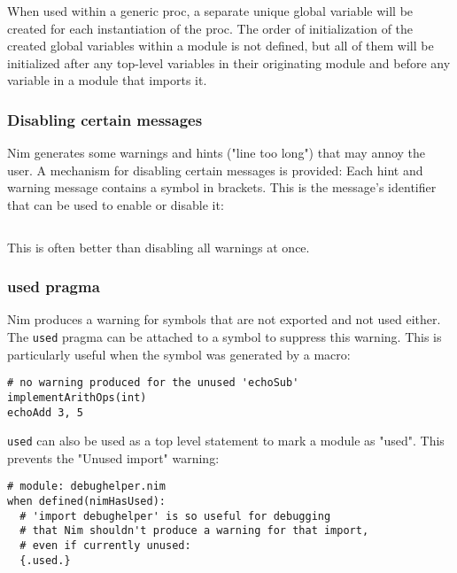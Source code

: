 \begin{verbatim}
\end{verbatim}

When used within a generic proc, a separate unique global variable will
be created for each instantiation of the proc. The order of
initialization of the created global variables within a module is not
defined, but all of them will be initialized after any top-level
variables in their originating module and before any variable in a
module that imports it.

\hypertarget{disabling-certain-messages}{%
\subsubsection{Disabling certain
messages}\label{disabling-certain-messages}}

Nim generates some warnings and hints ("line too long") that may annoy
the user. A mechanism for disabling certain messages is provided: Each
hint and warning message contains a symbol in brackets. This is the
message's identifier that can be used to enable or disable it:

\begin{verbatim}
\end{verbatim}

This is often better than disabling all warnings at once.

\hypertarget{used-pragma}{%
\subsubsection{used pragma}\label{used-pragma}}

Nim produces a warning for symbols that are not exported and not used
either. The \texttt{used} pragma can be attached to a symbol to suppress
this warning. This is particularly useful when the symbol was generated
by a macro:

\begin{verbatim}
# no warning produced for the unused 'echoSub'
implementArithOps(int)
echoAdd 3, 5
\end{verbatim}

\texttt{used} can also be used as a top level statement to mark a module
as "used". This prevents the "Unused import" warning:

\begin{verbatim}
# module: debughelper.nim
when defined(nimHasUsed):
  # 'import debughelper' is so useful for debugging
  # that Nim shouldn't produce a warning for that import,
  # even if currently unused:
  {.used.}
\end{verbatim}

